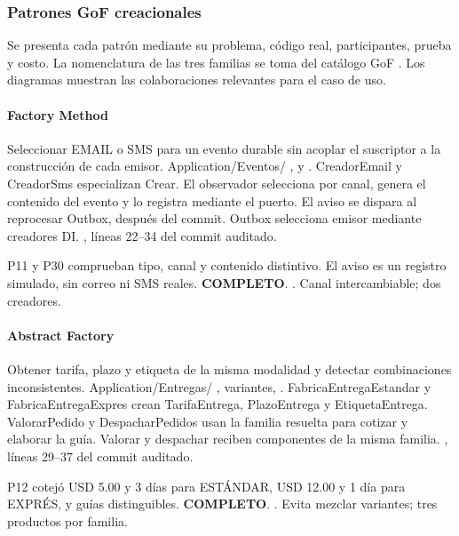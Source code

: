 \clearpage\subsubsection{Patrones GoF creacionales}
Se presenta cada patrón mediante su problema, código real, participantes, prueba y costo. La nomenclatura de las tres familias se toma del catálogo GoF \cite{gof}. Los diagramas muestran las colaboraciones relevantes para el caso de uso.
\paragraph{Factory Method}
 Seleccionar EMAIL o SMS para un evento durable sin acoplar el suscriptor a la construcción de cada emisor.
 Application/Eventos/ ,  y . CreadorEmail y CreadorSms especializan Crear. El observador selecciona por canal, genera el contenido del evento y lo registra mediante el puerto. El aviso se dispara al reprocesar Outbox, después del commit.
 Outbox selecciona emisor mediante creadores DI.
 , líneas 22--34 del commit auditado.

 P11 y P30 comprueban tipo, canal y contenido distintivo. El aviso es un registro simulado, sin correo ni SMS reales. \textbf{COMPLETO}.
 .
 Canal intercambiable; dos creadores.
\medskip
\clearpage
\paragraph{Abstract Factory}
 Obtener tarifa, plazo y etiqueta de la misma modalidad y detectar combinaciones inconsistentes.
 Application/Entregas/ , variantes, . FabricaEntregaEstandar y FabricaEntregaExpres crean TarifaEntrega, PlazoEntrega y EtiquetaEntrega. ValorarPedido y DespacharPedidos usan la familia resuelta para cotizar y elaborar la guía.
 Valorar y despachar reciben componentes de la misma familia.
 , líneas 29--37 del commit auditado.

 P12 cotejó USD 5.00 y 3 días para ESTÁNDAR, USD 12.00 y 1 día para EXPRÉS, y guías distinguibles. \textbf{COMPLETO}.
 .
 Evita mezclar variantes; tres productos por familia.
\medskip
\clearpage
